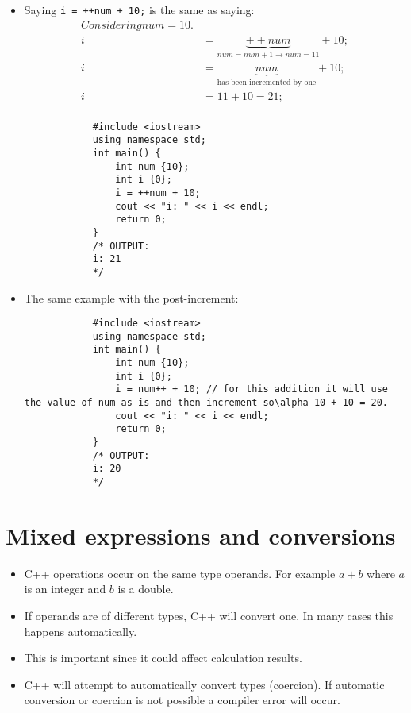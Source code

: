 \begin{itemize}
    \item Saying \texttt{i = ++num + 10;} is the same as saying:
        \begin{align*}
            Considering num = 10. \\ 
            i &= \underbrace{++num}_{num = num + 1 \to num = 11} + 10; \\ 
            i &= \underbrace{num}_{\text{has been incremented by one}} + 10; \\ 
            i &= 11 + 10 = 21; \\ 
        \end{align*}
        \begin{verbatim}
            #include <iostream>
            using namespace std;
            int main() {
                int num {10};
                int i {0};
                i = ++num + 10;
                cout << "i: " << i << endl;
                return 0;
            }
            /* OUTPUT:
            i: 21
            */
        \end{verbatim}
    
    \item The same example with the post-increment:
        \begin{verbatim}
            #include <iostream>
            using namespace std;
            int main() {
                int num {10};
                int i {0};
                i = num++ + 10; // for this addition it will use the value of num as is and then increment so\alpha 10 + 10 = 20.
                cout << "i: " << i << endl;
                return 0;
            }
            /* OUTPUT:
            i: 20
            */
        \end{verbatim}
\end{itemize}


\section{Mixed expressions and conversions}
\begin{itemize}
    \item C++ operations occur on the same type operands. For example $a+b$ where $a$ is an integer and $b$ is a double. 
    \item If operands are of different types, C++ will convert one. In many cases this happens automatically.
    \item This is important since it could affect calculation results.
    \item C++ will attempt to automatically convert types (coercion). If automatic conversion or coercion is not possible a compiler error will occur.
\end{itemize}

